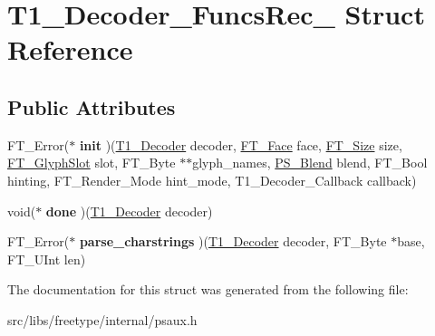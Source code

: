 \hypertarget{struct_t1___decoder___funcs_rec__}{
\section{T1\_\-Decoder\_\-FuncsRec\_\- Struct Reference}
\label{struct_t1___decoder___funcs_rec__}
}
\subsection*{Public Attributes}
\begin{DoxyCompactItemize}
\item 
\hypertarget{struct_t1___decoder___funcs_rec___a10baf5f433631fb6e73e639fca7e9478}{
FT\_\-Error($\ast$ {\bfseries init} )(\hyperlink{struct_t1___decoder_rec__}{T1\_\-Decoder} decoder, \hyperlink{struct_f_t___face_rec__}{FT\_\-Face} face, \hyperlink{struct_f_t___size_rec__}{FT\_\-Size} size, \hyperlink{struct_f_t___glyph_slot_rec__}{FT\_\-GlyphSlot} slot, FT\_\-Byte $\ast$$\ast$glyph\_\-names, \hyperlink{struct_p_s___blend_rec__}{PS\_\-Blend} blend, FT\_\-Bool hinting, FT\_\-Render\_\-Mode hint\_\-mode, T1\_\-Decoder\_\-Callback callback)}
\label{struct_t1___decoder___funcs_rec___a10baf5f433631fb6e73e639fca7e9478}

\item 
\hypertarget{struct_t1___decoder___funcs_rec___a2d76ed11eab173c09dc8f5cde75a64ee}{
void($\ast$ {\bfseries done} )(\hyperlink{struct_t1___decoder_rec__}{T1\_\-Decoder} decoder)}
\label{struct_t1___decoder___funcs_rec___a2d76ed11eab173c09dc8f5cde75a64ee}

\item 
\hypertarget{struct_t1___decoder___funcs_rec___a921b7ac2c00f97c425643c5a612b3c38}{
FT\_\-Error($\ast$ {\bfseries parse\_\-charstrings} )(\hyperlink{struct_t1___decoder_rec__}{T1\_\-Decoder} decoder, FT\_\-Byte $\ast$base, FT\_\-UInt len)}
\label{struct_t1___decoder___funcs_rec___a921b7ac2c00f97c425643c5a612b3c38}

\end{DoxyCompactItemize}


The documentation for this struct was generated from the following file:\begin{DoxyCompactItemize}
\item 
src/libs/freetype/internal/psaux.h\end{DoxyCompactItemize}
